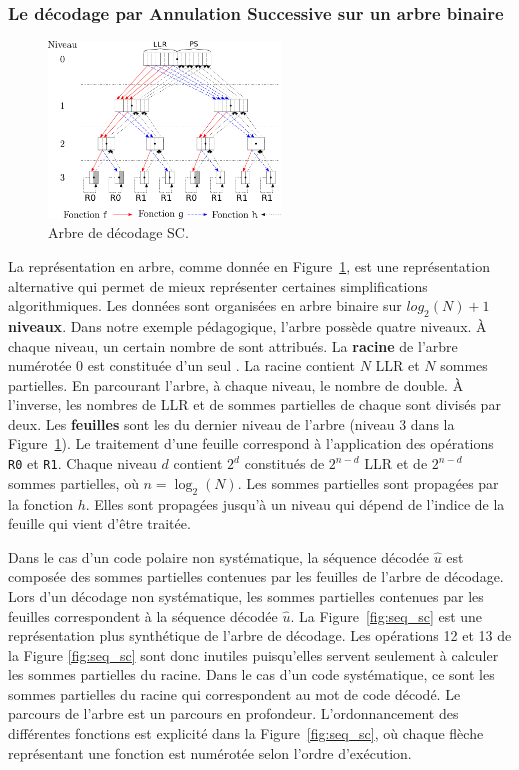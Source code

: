 \subsubsection{Le décodage par Annulation Successive sur un arbre binaire}
\begin{figure}[t]
\centering
\includegraphics[width=0.55\textwidth]{main/ch1_fig/sc}
\caption{Arbre de décodage SC.}
\label{fig:sc}
\end{figure}
La représentation en arbre, comme donnée en Figure~\ref{fig:sc}, est une représentation alternative qui permet de mieux représenter certaines simplifications algorithmiques.
Les données sont organisées en arbre binaire sur $log_2(N) + 1$ \textbf{niveaux}. Dans notre exemple pédagogique, l'arbre possède quatre niveaux.
\`A chaque niveau, un certain nombre de \textbf{\noeuds} sont attribués.
La \textbf{racine} de l'arbre numérotée $0$ est constituée d'un seul \noeud.
La racine contient $N$ LLR et $N$ sommes partielles.
En parcourant l'arbre, à chaque niveau, le nombre de \noeuds double.
\`A l'inverse, les nombres de LLR et de sommes partielles de chaque \noeud sont divisés par deux.
Les \textbf{feuilles} sont les \noeuds du dernier niveau de l'arbre (niveau 3 dans la Figure~\ref{fig:sc}).
Le traitement d'une feuille correspond à l'application des opérations \texttt{R0} et \texttt{R1}.
Chaque niveau $d$ contient $2^d$ \noeuds constitués de $2^{n-d}$ LLR et de $2^{n-d}$ sommes partielles, où $n=\log_2(N)$. 
Les sommes partielles sont propagées par la fonction $h$. Elles sont propagées jusqu'à un niveau qui dépend de l'indice de la feuille qui vient d'être traitée.

Dans le cas d'un code polaire non systématique, la séquence décodée $\hat{u}$ est composée des sommes partielles contenues par les feuilles de l'arbre de décodage.
Lors d'un décodage non systématique, les sommes partielles contenues par les feuilles correspondent à la séquence décodée $\hat{u}$.
La Figure~\ref{fig:seq_sc} est une représentation plus synthétique de l'arbre de décodage.
Les opérations 12 et 13 de la Figure \ref{fig:seq_sc} sont donc inutiles puisqu'elles servent seulement à calculer les sommes partielles du \noeud racine.
Dans le cas d'un code systématique, ce sont les sommes partielles du \noeud racine qui correspondent au mot de code décodé.
Le parcours de l'arbre est un parcours en profondeur.
L'ordonnancement des différentes fonctions est explicité dans la Figure~\ref{fig:seq_sc}, où chaque flèche représentant une fonction est numérotée selon l'ordre d'exécution.


